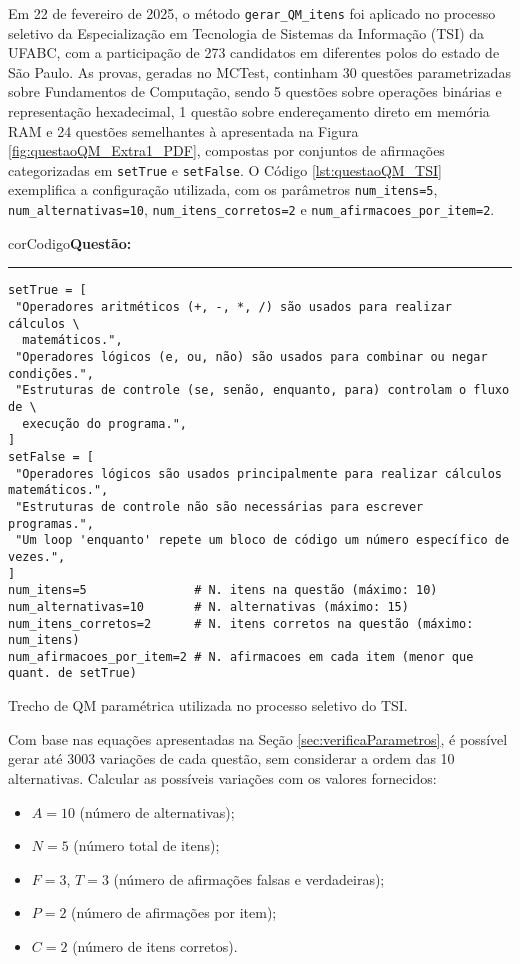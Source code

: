 Em 22 de fevereiro de 2025, o método \texttt{gerar\_QM\_itens} foi aplicado no processo seletivo da Especialização em Tecnologia de Sistemas da Informação (TSI) da UFABC, com a participação de 273 candidatos em diferentes polos do estado de São Paulo. As provas, geradas no MCTest, continham 30 questões parametrizadas sobre Fundamentos de Computação, sendo 5 questões sobre operações binárias e representação hexadecimal, 1 questão sobre endereçamento direto em memória RAM e 24 questões semelhantes à apresentada na Figura \ref{fig:questaoQM_Extra1_PDF}, compostas por conjuntos de afirmações categorizadas em \verb|setTrue| e \verb|setFalse|. O Código \ref{lst:questaoQM_TSI} exemplifica a configuração utilizada, com os parâmetros \texttt{num\_itens=5}, \texttt{num\_alternativas=10}, \texttt{num\_itens\_corretos=2} e \texttt{num\_afirmacoes\_por\_item=2}.

\begin{listing}[!ht]
  \begin{myboxCode}{corCodigo}{\textbf{Questão: }}\vspace{3mm}
  \hrule
  \begin{verbatim}
setTrue = [
 "Operadores aritméticos (+, -, *, /) são usados para realizar cálculos \
  matemáticos.",
 "Operadores lógicos (e, ou, não) são usados para combinar ou negar condições.",
 "Estruturas de controle (se, senão, enquanto, para) controlam o fluxo de \
  execução do programa.",
]
setFalse = [
 "Operadores lógicos são usados principalmente para realizar cálculos matemáticos.",
 "Estruturas de controle não são necessárias para escrever programas.",
 "Um loop 'enquanto' repete um bloco de código um número específico de vezes.",
]
num_itens=5               # N. itens na questão (máximo: 10)
num_alternativas=10       # N. alternativas (máximo: 15)
num_itens_corretos=2      # N. itens corretos na questão (máximo: num_itens)
num_afirmacoes_por_item=2 # N. afirmacoes em cada item (menor que quant. de setTrue)
\end{verbatim}
\end{myboxCode}
\caption{Trecho de QM paramétrica utilizada no processo seletivo do TSI.}
\label{lst:questaoQM_TSI}
\end{listing}

Com base nas equações apresentadas na Seção \ref{sec:verificaParametros}, é possível gerar até 3003 variações de cada questão, sem considerar a ordem das 10 alternativas. Calcular as possíveis variações com os valores fornecidos:
\begin{itemize}
    \item $A = 10$ (número de alternativas);
    \item $N = 5$ (número total de itens);
    \item $F = 3$, $T = 3$ (número de afirmações falsas e verdadeiras);
    \item $P = 2$ (número de afirmações por item);
    \item $C = 2$ (número de itens corretos).
\end{itemize}

